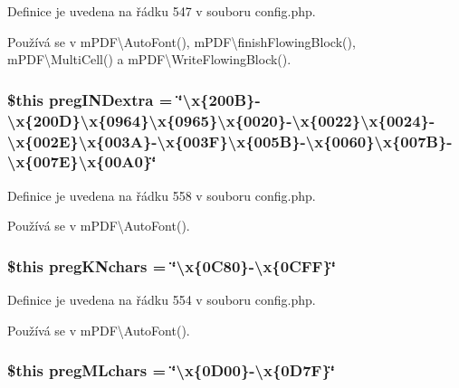 Definice je uvedena na řádku 547 v souboru config.\-php.



Používá se v m\-P\-D\-F\textbackslash{}\-Auto\-Font(), m\-P\-D\-F\textbackslash{}finish\-Flowing\-Block(), m\-P\-D\-F\textbackslash{}\-Multi\-Cell() a m\-P\-D\-F\textbackslash{}\-Write\-Flowing\-Block().

\hypertarget{config_8php_aa41611bb95e2193d332ec85b1e20041a}{
\subsubsection[{preg\-I\-N\-Dextra}]{\setlength{\rightskip}{0pt plus 5cm}\$this preg\-I\-N\-Dextra = \char`\"{}\textbackslash{}x\{200\-B\}-\/\textbackslash{}x\{200\-D\}\textbackslash{}x\{0964\}\textbackslash{}x\{0965\}\textbackslash{}x\{0020\}-\/\textbackslash{}x\{0022\}\textbackslash{}x\{0024\}-\/\textbackslash{}x\{002\-E\}\textbackslash{}x\{003\-A\}-\/\textbackslash{}x\{003\-F\}\textbackslash{}x\{005\-B\}-\/\textbackslash{}x\{0060\}\textbackslash{}x\{007\-B\}-\/\textbackslash{}x\{007\-E\}\textbackslash{}x\{00\-A0\}\char`\"{}}}\label{config_8php_aa41611bb95e2193d332ec85b1e20041a}


Definice je uvedena na řádku 558 v souboru config.\-php.



Používá se v m\-P\-D\-F\textbackslash{}\-Auto\-Font().

\hypertarget{config_8php_ae099457fad0f1be48f506cfb45a75da2}{
\subsubsection[{preg\-K\-Nchars}]{\setlength{\rightskip}{0pt plus 5cm}\$this preg\-K\-Nchars = \char`\"{}\textbackslash{}x\{0\-C80\}-\/\textbackslash{}x\{0\-C\-F\-F\}\char`\"{}}}\label{config_8php_ae099457fad0f1be48f506cfb45a75da2}


Definice je uvedena na řádku 554 v souboru config.\-php.



Používá se v m\-P\-D\-F\textbackslash{}\-Auto\-Font().

\hypertarget{config_8php_a6d1234147d77eeccaf6b9e0d9d1c8d63}{
\subsubsection[{preg\-M\-Lchars}]{\setlength{\rightskip}{0pt plus 5cm}\$this preg\-M\-Lchars = \char`\"{}\textbackslash{}x\{0\-D00\}-\/\textbackslash{}x\{0\-D7\-F\}\char`\"{}}}\label{config_8php_a6d1234147d77eeccaf6b9e0d9d1c8d63}


